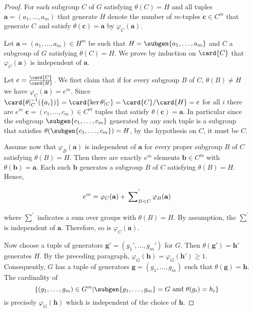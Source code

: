\begin{proof}
    For each subgroup $C$ of $G$ satisfying $\theta(C) = H$ and all tuples $\mathbf{a} = (a_1,\ldots ,a_m)$ that generate $H$ denote the number of $m$-tuples $\mathbf{c} \in C^m$ that generate $C$ and satisfy $\theta(\mathbf{c}) = \mathbf{a}$ by $\varphi_C(\mathbf{a})$. 
    
    Let $\mathbf{a} = (a_1,\ldots ,a_m) \in H^m$ be such that $H = \subgen{a_1, \ldots , a_m}$ and $C$ a subgroup of $G$ satisfying $\theta(C) = H$.
    We prove by induction on $\card{C}$ that $\varphi_C(\mathbf{a})$ is independent of $\mathbf{a}$.

    Let $e = \frac{\card{C}}{\card{H}}$.
    We first claim that if for every subgroup $B$ of $C$, $\theta(B) \ne H$ we have $\varphi_C(\mathbf{a}) = e^m$. Since $\card{\theta|_{C}^{-1}(\{a_i\})} = \card{\ker \theta|_{C}} = \card{C}/\card{H} = e$ for all $i$ there are $e^m$ $\mathbf{c} = (c_1, \ldots , c_m) \in C^m$ tuples that satisfy $\theta(\mathbf{c}) = \mathbf{a}$. In particular since the subgroup $\subgen{c_1, \ldots , c_m}$ generated by any such tuple is a subgroup that satisfies $\theta(\subgen{c_1, \ldots , c_m}) = H$, by the hypothesis on $C$, it must be $C$. 
    
    Assume now that $\varphi_B(\mathbf{a})$ is independent of $\mathbf{a}$ for every proper subgroup $B$ of $C$ satisfying $\theta(B) = H$. Then there are exactly $e^m$ elements $\mathbf{b} \in C^m$ with $\theta(\mathbf{b}) = \mathbf{a}$. Each such $\mathbf{b}$ generates a subgroup $B$ of $C$ satisfying $\theta(B) = H$. Hence,
    $$
    e^m = \varphi_C(\mathbf{a}) + \sideset{}{}{\sum_{B < C}^{'}} \varphi_B(\mathbf{a})
    $$
    where $\sum_{}^{'}$ indicates a sum over groups with $\theta(B) = H$. By assumption, the $\sum_{}^{'}$ is independent of $\mathbf{a}$. Therefore, so is $\varphi_C(\mathbf{a})$.

    Now choose a tuple of generators $\mathbf{g'} = (g_1', \ldots , g_m')$ for $G$. 
    Then $\theta(\mathbf{g'}) = \mathbf{h'}$ generates $H$. By the preceding paragraph, $\varphi_G(\mathbf{h}) = \varphi_G(\mathbf{h'}) \ge 1$. 
    Consequently, $G$ has a tuple of generators $\mathbf{g} =(g_1, \ldots , g_m)$ such that $\theta(\mathbf{g}) = \mathbf{h}$. 
    The cardinality of 
    $$
    \left\{(g_1,\ldots ,g_m) \in G^m |\subgen{g_1,\ldots ,g_m} = G \text{ and } \theta(g_i) = h_i \right\}
    $$ 
    is precisely $\varphi_G(\mathbf{h})$ which is independent of the choice of $\mathbf{h}$.
\end{proof}

